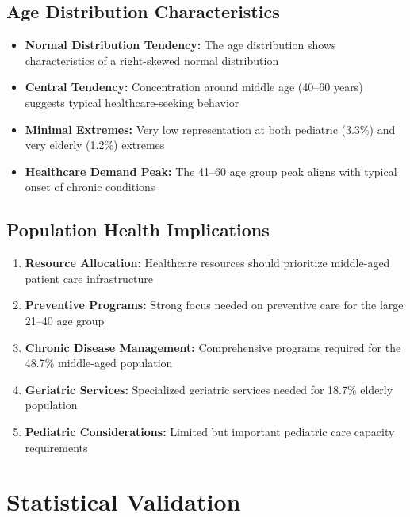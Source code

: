 \documentclass[10pt]{article}
\begin{document}
\subsection{Age Distribution Characteristics}

\begin{itemize}
\item \textbf{Normal Distribution Tendency:} The age distribution shows characteristics of a right-skewed normal distribution
\item \textbf{Central Tendency:} Concentration around middle age (40--60 years) suggests typical healthcare-seeking behavior
\item \textbf{Minimal Extremes:} Very low representation at both pediatric (3.3\%) and very elderly (1.2\%) extremes
\item \textbf{Healthcare Demand Peak:} The 41--60 age group peak aligns with typical onset of chronic conditions
\end{itemize}

\subsection{Population Health Implications}

\begin{enumerate}
\item \textbf{Resource Allocation:} Healthcare resources should prioritize middle-aged patient care infrastructure
\item \textbf{Preventive Programs:} Strong focus needed on preventive care for the large 21--40 age group
\item \textbf{Chronic Disease Management:} Comprehensive programs required for the 48.7\% middle-aged population
\item \textbf{Geriatric Services:} Specialized geriatric services needed for 18.7\% elderly population
\item \textbf{Pediatric Considerations:} Limited but important pediatric care capacity requirements
\end{enumerate}

\section{Statistical Validation}
\end{document}
